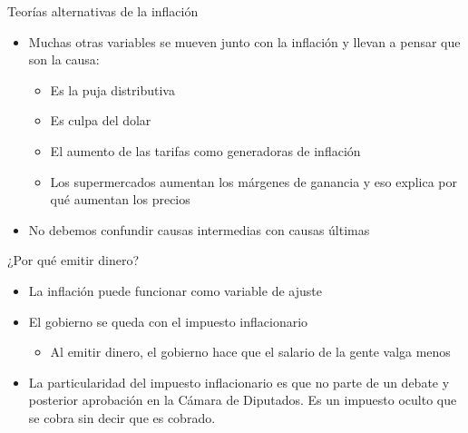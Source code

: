 \documentclass{beamer}
\begin{document}
\begin{frame}{Teorías alternativas de la inflación}
    \begin{itemize}
        \item Muchas otras variables se mueven junto con la inflación y llevan a pensar que son la causa:
        \begin{itemize}
            \item Es la puja distributiva
            \item Es culpa del dolar
            \item El aumento de las tarifas como generadoras de inflación
            \item Los supermercados aumentan los márgenes de ganancia y eso explica por qué aumentan los precios
        \end{itemize}
        \item No debemos confundir causas intermedias con causas últimas
    \end{itemize}
\end{frame}




\begin{frame}{¿Por qué emitir dinero?}
    \begin{itemize}
        \item La inflación puede funcionar como variable de ajuste
        \item El gobierno se queda con el impuesto inflacionario
        \begin{itemize}
            \item Al emitir dinero, el gobierno hace que el salario de la gente valga menos
        \end{itemize}
        \item La particularidad del impuesto inflacionario es que no parte de un debate y posterior aprobación en la Cámara de Diputados. Es un impuesto oculto que se cobra sin decir que es cobrado.
    \end{itemize}
\end{frame}
\end{document}
